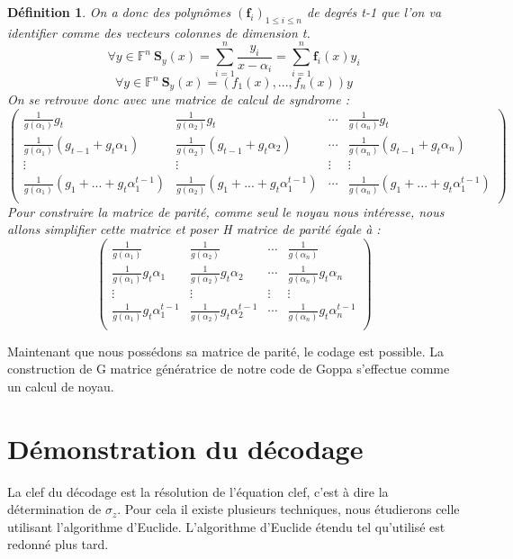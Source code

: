 \documentclass{article}
\newtheorem{defi}{Définition}
\begin{document}
		\begin{defi}
			On a donc des polynômes $(\mathbf{f}_{i})_{1\leq i \leq n}$ de degrés t-1 que l'on va identifier comme des vecteurs colonnes de dimension t.
			$$ \forall y \in \mathbb{F}^{n} \ \mathbf{S}_{y}(x) = \sum_{i=1}^{n} \frac{y_{i}}{x-\alpha_{i}} = \sum_{i=1}^{n} \mathbf{f}_{i}(x)y_{i}$$
			$$ \forall y \in \mathbb{F}^{n} \  \mathbf{S}_{y}(x) =(f_{1}(x), ... , f_{n}(x))y $$
			On se retrouve donc avec une matrice de calcul de syndrome :
			$$ 
			\begin{pmatrix}
				\frac{1}{g(\alpha_{1})}g_{t} &  \frac{1}{g(\alpha_{2})}g_{t} & \cdots &  \frac{1}{g(\alpha_{n})}g_{t} \\
				\frac{1}{g(\alpha_{1})}(g_{t-1} + g_{t}\alpha_{1}) &  \frac{1}{g(\alpha_{2})}(g_{t-1} + g_{t}\alpha_{2}) & \cdots &  \frac{1}{g(\alpha_{n})}(g_{t-1} + g_{t}\alpha_{n}) \\
				\vdots & \vdots & \vdots & \vdots\\
				\frac{1}{g(\alpha_{1})}(g_{1} + ... +g_{t}\alpha_{1}^{t-1}) &  \frac{1}{g(\alpha_{2})}(g_{1} + ... +g_{t}\alpha_{1}^{t-1}) & \cdots &  \frac{1}{g(\alpha_{n})}(g_{1} + ... +g_{t}\alpha_{1}^{t-1}) \\
			\end{pmatrix}
			$$
			Pour construire la matrice de parité, comme seul le noyau nous intéresse, nous allons simplifier cette matrice et poser H matrice de parité égale à :
			$$
			\begin{pmatrix}
				\frac{1}{g(\alpha_{1})} &  \frac{1}{g(\alpha_{2})} & \cdots &  \frac{1}{g(\alpha_{n})} \\
				\frac{1}{g(\alpha_{1})}g_{t}\alpha_{1} &  \frac{1}{g(\alpha_{2})}g_{t}\alpha_{2} & \cdots &  \frac{1}{g(\alpha_{n})}g_{t}\alpha_{n}\\
				\vdots & \vdots & \vdots & \vdots\\
				\frac{1}{g(\alpha_{1})}g_{t}\alpha_{1}^{t-1} &  \frac{1}{g(\alpha_{2})}g_{t}\alpha_{2}^{t-1} & \cdots &  \frac{1}{g(\alpha_{n})}g_{t}\alpha_{n}^{t-1} \\
			\end{pmatrix}
			$$
		\end{defi}

		Maintenant que nous possédons sa matrice de parité, le codage est possible. 
		La construction de G matrice génératrice de notre code de Goppa s'effectue comme un calcul de noyau.

	\section{Démonstration du décodage}
		\label{eqclef}
		La clef du décodage est la résolution de l'équation clef, c'est à dire la détermination de $\sigma_{z}$.
		Pour cela il existe plusieurs techniques, nous étudierons celle utilisant l'algorithme d'Euclide.
		L'algorithme d'Euclide étendu tel qu'utilisé est redonné plus tard.
\end{document}
